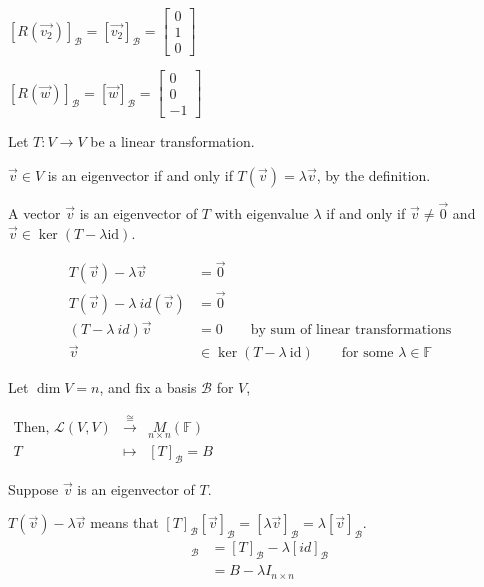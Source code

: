 \documentclass[11pt,fleqn]{book} %
\begin{document}
$[R(\overrightarrow{v_2})]_\mathcal{B} = [\overrightarrow{v_2}]_\mathcal{B}=\begin{bmatrix} 0\\1\\0 \end{bmatrix}$

$[R(\overrightarrow{w})]_\mathcal{B} = [\overrightarrow{w}]_\mathcal{B}=\begin{bmatrix} 0\\0\\-1 \end{bmatrix}$

Let $T: V \to V$ be a linear transformation.

$\overrightarrow{v} \in V$  is an eigenvector if and only if $T(\overrightarrow{v}) = \lambda \overrightarrow{v}$, by the definition.

\setcounter{chapter}{4}
\setcounter{dummy}{4}
\begin{proposition}
    A vector $\overrightarrow{v}$ is an eigenvector of $T$ with eigenvalue $\lambda$ if and only if $\overrightarrow{v} \neq \overrightarrow{0}$ and $\overrightarrow{v} \in \ker(T - \lambda \mathrm{id})$.
\end{proposition}
\setcounter{chapter}{3}
\begin{align*}
    T(\overrightarrow{v}) - \lambda \overrightarrow{v}
    &= \overrightarrow{0}
    \\
    T(\overrightarrow{v}) - \lambda ~ id(\overrightarrow{v})
    &= \overrightarrow{0}
    \\
    (T-\lambda ~ id)\overrightarrow{v}
    &= 0
    \qquad\text{by sum of linear transformations}
    \\
    \overrightarrow{v} &\in \ker (T - \lambda ~ \mathrm{id}) \qquad\text{for some }\lambda \in \mathbb{F}
\end{align*}

Let $\dim V = n$, and fix a basis $\mathcal{B}$ for $V$,

$\begin{matrix}
\text{Then, }
\mathcal{L}(V, V)
&\overset{\cong}{\to}
&\underset{n \times n}M(\mathbb{F})
\\
T &\mapsto &[T]_\mathcal{B} = B
\end{matrix}$

Suppose $\overrightarrow{v}$ is an eigenvector of $T$.

$T(\overrightarrow{v}) - \lambda \overrightarrow{v}$ means that $[T]_\mathcal{B}[\overrightarrow{v}]_\mathcal{B} = [\lambda\overrightarrow{v}]_\mathcal{B} = \lambda [\overrightarrow{v}]_\mathcal{B}$.
\begin{align*}
    [T - \lambda ~ id]_\mathcal{B}
    &= [T]_\mathcal{B} - \lambda[id]_\mathcal{B}
    \\
    &={B - \lambda I}_{n \times n}
\end{align*}
\end{document}
